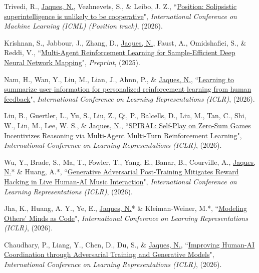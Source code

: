 \documentclass[paper=letter,fontsize=11pt]{scrartcl} %
\newcommand{\PaperEntry}[6]{
		\noindent #1, ``\href{#6}{#2}", \textit{#3}, #4 (#5).}
\begin{document}
\begin{etaremune}
\item \PaperEntry{Trivedi, R., \underline{Jaques, N.}, Vezhnevets, S., \& Leibo, J. Z.}{Position: Solipsistic superintelligence is unlikely to be cooperative}{International Conference on Machine Learning (ICML) (Position track)}{}{2026}{https://arxiv.org/abs/2606.03237}

\item \PaperEntry{Krishnan, S., Jabbour, J., Zhang, D., \underline{Jaques, N.}, Faust, A., Omidshafiei, S., \& Reddi, V.}{Multi-Agent Reinforcement Learning for Sample-Efficient Deep Neural Network Mapping}{Preprint}{}{2025}{https://arxiv.org/abs/2507.16249}

\item \PaperEntry{Nam, H., Wan, Y., Liu, M., Lian, J., Ahnn, P., \& \underline{Jaques, N.}}{Learning to summarize user information for personalized reinforcement learning from human feedback}{International Conference on Learning Representations (ICLR)}{}{2026}{https://arxiv.org/abs/2507.13579v2}

\item \PaperEntry{Liu, B., Guertler, L., Yu, S., Liu, Z., Qi, P., Balcells, D., Liu, M., Tan, C., Shi, W., Lin, M., Lee, W. S.,  \& \underline{Jaques, N.}}{SPIRAL: Self-Play on Zero-Sum Games Incentivizes Reasoning via Multi-Agent Multi-Turn Reinforcement Learning}{International Conference on Learning Representations (ICLR)}{}{2026}{https://arxiv.org/abs/2506.24119}

\item \PaperEntry{Wu, Y., Brade, S., Ma, T., Fowler, T., Yang, E., Banar, B., Courville, A., \underline{Jaques, N.}* \& Huang, A.*}{Generative Adversarial Post-Training Mitigates Reward Hacking in Live Human-AI Music Interaction}{International Conference on Learning Representations (ICLR)}{}{2026}{https://arxiv.org/abs/2511.17879}

\item \PaperEntry{Jha, K., Huang, A. Y., Ye, E., \underline{Jaques, N.}* \& Kleiman-Weiner, M.*}{Modeling Others' Minds as Code}{International Conference on Learning Representations (ICLR)}{}{2026}{https://arxiv.org/abs/2510.01272}

\item \PaperEntry{Chaudhary, P., Liang, Y., Chen, D., Du, S., \& \underline{Jaques, N.}}{Improving Human-AI Coordination through Adversarial Training and Generative Models}{International Conference on Learning Representations (ICLR)}{}{2026}{https://arxiv.org/abs/2504.15457}



\end{etaremune}
\end{document}
